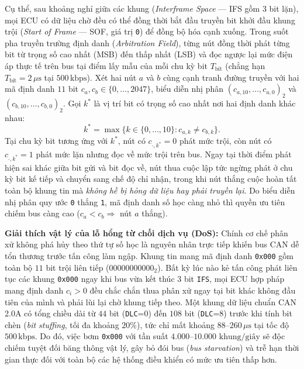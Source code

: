 \documentclass[12pt, a4paper, reqno, oneside]{book}
\DeclareRobustCommand{\code}[1]{\nolinkurl{#1}}
\begin{document}
Cụ thể, sau khoảng nghỉ giữa các khung (\textit{Interframe Space} --- IFS gồm $3$ bit lặn), mọi ECU có dữ liệu chờ đều có thể đồng thời bắt đầu truyền bit khởi đầu khung trội (\textit{Start of Frame} --- SOF, giá trị \texttt{0}) để đồng bộ hóa cạnh xuống. Trong suốt pha truyền trường định danh (\textit{Arbitration Field}), từng nút đồng thời phát từng bit từ trọng số cao nhất (MSB) đến thấp nhất (LSB) và đọc ngược lại mức điện áp thực tế trên bus tại điểm lấy mẫu của mỗi chu kỳ bit $T_{\text{bit}}$ (chẳng hạn $T_{\text{bit}} = 2\,\mu\text{s}$ tại $500\,\text{kbps}$). Xét hai nút $a$ và $b$ cùng cạnh tranh đường truyền với hai mã định danh $11$ bit $c_a, c_b \in \{0, \ldots, 2047\}$, biểu diễn nhị phân $(c_{a,10}, \ldots, c_{a,0})_2$ và $(c_{b,10}, \ldots, c_{b,0})_2$. Gọi $k^*$ là vị trí bit có trọng số cao nhất nơi hai định danh khác nhau:
\begin{equation}\label{eq:can-arbitration}
k^* = \max\big\{k \in \{0, \ldots, 10\} : c_{a,k} \neq c_{b,k}\big\}.
\end{equation}
Tại chu kỳ bit tương ứng với $k^*$, nút có $c_{\cdot, k^*} = 0$ phát mức trội, còn nút có $c_{\cdot, k^*} = 1$ phát mức lặn nhưng đọc về mức trội trên bus. Ngay tại thời điểm phát hiện sai khác giữa bit gửi và bit đọc về, nút thua cuộc lập tức ngừng phát ở chu kỳ bit kế tiếp và chuyển sang chế độ chỉ nhận, trong khi nút thắng cuộc hoàn tất toàn bộ khung tin mà \emph{không hề bị hỏng dữ liệu hay phải truyền lại}. Do biểu diễn nhị phân quy ước \texttt{0} thắng \texttt{1}, mã định danh số học càng nhỏ thì quyền ưu tiên chiếm bus càng cao ($c_a < c_b \Rightarrow$ nút $a$ thắng).

\textbf{Giải thích vật lý của lỗ hổng từ chối dịch vụ (DoS):} Chính cơ chế phân xử không phá hủy theo thứ tự số học là nguyên nhân trực tiếp khiến bus CAN dễ tổn thương trước tấn công làm ngập. Khung tin mang mã định danh \texttt{0x000} gồm toàn bộ $11$ bit trội liên tiếp ($00000000000_2$). Bất kỳ lúc nào kẻ tấn công phát liên tục các khung \texttt{0x000} ngay khi bus vừa kết thúc $3$ bit \code{IFS}, mọi ECU hợp pháp mang định danh $c_i > 0$ đều chắc chắn thua phân xử ngay tại bit khác không đầu tiên của mình và phải lùi lại chờ khung tiếp theo. Một khung dữ liệu chuẩn CAN 2.0A có tổng chiều dài từ $44$ bit (\code{DLC}=0) đến $108$ bit (\code{DLC}=8) trước khi tính bit chèn (\textit{bit stuffing}, tối đa khoảng $20\%$), tức chỉ mất khoảng $88\text{--}260\,\mu\text{s}$ tại tốc độ $500\,\text{kbps}$. Do đó, việc bơm \texttt{0x000} với tần suất $4.000\text{--}10.000\text{ khung/giây}$ sẽ độc chiếm tuyệt đối băng thông vật lý, gây bỏ đói bus (\textit{bus starvation}) và trễ hạn thời gian thực đối với toàn bộ các hệ thống điều khiển có mức ưu tiên thấp hơn.
\end{document}
